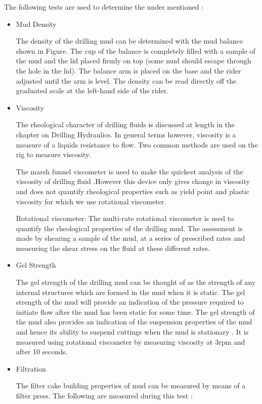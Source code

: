 \documentclass[11pt,a4paper]{article}
\begin{document}
The following tests are used to determine the under mentioned :
\begin{itemize}

\item Mud Density

The density of the drilling mud can be determined with the mud balance shown in Figure. The cup of the balance is completely filled with a sample of the
mud and the lid placed firmly on top (some mud should escape through the hole in the lid). The balance arm is placed on the base and the rider adjusted until the arm is level. The density can be read directly off the graduated scale at the left-hand side of the rider.

\item Viscosity

The rheological character of drilling fluids is discussed at length in the chapter on Drilling Hydraulics. In general terms however, viscosity is a measure of a liquids resistance to flow. Two common methods are used on the rig to measure viscosity.

The marsh funnel viscometer is used to make the quickest analysis of the viscosity of drilling fluid .However this device only gives change in viscosity and does not quantify rheological properties such as yield point and plastic viscosity for which we use rotational viscometer.

Rotational viscometer: The multi-rate rotational viscometer is used
to quantify the rheological properties of the drilling mud. The
assessment is made by shearing a sample of the mud, at a series of
prescribed rates and measuring the shear stress on the fluid at these
different rates.


\item Gel Strength

The gel strength of the drilling mud can be thought of as the strength of any internal structures which are formed in the mud when it is static. The gel strength of the mud will provide an indication of the pressure required to initiate flow after the mud has been static for some time. The gel strength of the mud also provides an indication of the suspension properties of the mud and hence its ability to suspend cuttings when the mud is stationary . It is measured using rotational viscometer by measuring viscosity at 3rpm and after 10 seconds.

\item Filtration

The filter cake building properties of mud can be measured by means of a filter press. The following are measured during this test :


\end{itemize}
\end{document}
